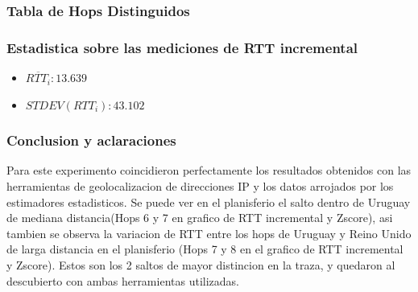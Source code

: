 \subsubsection{Tabla de Hops Distinguidos}
\begin{center}
\end{center}

\subsubsection{Estadistica sobre las mediciones de RTT incremental}
\begin{itemize}
	\item $\overline{RTT_i}: 13.639$
	\item $STDEV(RTT_i): 43.102$
\end{itemize}

\subsubsection{Conclusion y aclaraciones}
Para este experimento coincidieron perfectamente los resultados obtenidos con las herramientas de geolocalizacion de direcciones IP y los datos arrojados por los estimadores estadisticos. Se puede ver en el planisferio el salto dentro de Uruguay de mediana distancia(Hops 6 y 7 en grafico de RTT incremental y Zscore), asi tambien se observa la variacion de RTT entre los hops de Uruguay y Reino Unido de larga distancia en el planisferio (Hops 7 y 8 en el grafico de RTT incremental y Zscore). Estos son los 2 saltos de mayor distincion en la traza, y quedaron al descubierto con ambas herramientas utilizadas.
